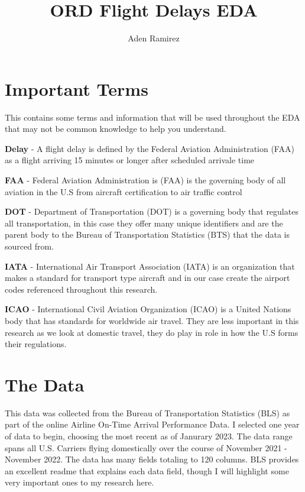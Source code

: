 \documentclass[a4paper,11pt]{article}
\begin{document}
\title{ORD Flight Delays EDA}
\author{Aden Ramirez}
\maketitle

\begin{abstract}
\end{abstract}

\section{Important Terms}
This contains some terms and information that will be used throughout the EDA that may not be common knowledge to help you understand. 

\textbf{Delay} - A flight delay is defined by the Federal Aviation Administration (FAA) as a flight arriving 15 minutes or longer after scheduled arrivale time

\textbf{FAA} - Federal Aviation Administration is (FAA) is the governing body of all aviation in the U.S from aircraft certification to air traffic control

\textbf{DOT} - Department of Transportation (DOT) is a governing body that regulates all transportation, in this case they offer many unique identifiers 
and are the parent body to the Bureau of Transportation Statistics (BTS) that the data is sourced from.

\textbf{IATA} - International Air Transport Association (IATA) is an organization that makes a standard for transport type aircraft and in our case create the airport codes referenced
throughout this research. 

\textbf{ICAO} - International Civil Aviation Organization (ICAO) is a United Nations body that has standards for worldwide air travel. They are less important in this research as we look at domestic travel,
they do play in role in how the U.S forms their regulations.

\section{The Data} \label{data}
This data was collected from the Bureau of Transportation Statistics (BLS) as part of the online Airline On-Time Arrival Performance Data. 
I selected one year of data to begin, choosing the most recent as of Janurary 2023. The data range spans all U.S. Carriers flying domestically over the course of November 2021 - November 2022.
The data has many fields totaling to 120 columns. BLS provides an excellent readme that explains each data field, though I will highlight some very important ones to my research here.
\end{document}

